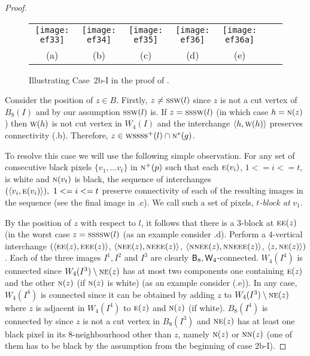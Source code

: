 \documentclass[lotsofwhite,charterfonts]{patmorin}
\newcommand{\eightfour}{\ensuremath{\protect\textup{\textsf{B}}_{8},\protect\textup{\textsf{W}}_{4}}}
\newcommand{\N}{\textsc{n}}
\newcommand{\NE}{\textsc{ne}}
\newcommand{\E}{\textsc{e}}
\renewcommand{\S}{\textsc{s}}
\newcommand{\W}{\textsc{w}}
\newcommand{\ic}[2]{\langle #1,#2 \rangle}
\newcommand{\sm}{\ensuremath{\setminus}}
\begin{document}
\begin{proof}
\begin{figure}[htbp]
\begin{center}
\begin{tabular}{ccccccc}
\texttt{[image: ef33]} & 
\texttt{[image: ef34]} & 
\texttt{[image: ef35]} &  
\texttt{[image: ef36]} &
\texttt{[image: ef36a]} 
\\
(a) & (b) & (c) & (d) & (e)
\end{tabular}
\end{center}
\caption{Illustrating Case~2b-I in the proof of .}
\end{figure}


Consider the position of $z\in B$. Firstly, $z\not=\S\S\W(l)$ since
$z$ is not a cut vertex of $B_8(I)$ and by our assumption $\S\S\W(l)$
is. If $z=\S\S\S\W(l)$  (in which case $h=\N(z)$) then $\W(h)$ is not
cut vertex in $W_4(I)$ and the interchange $\ic{h}{\W(h)}$ preserves
connectivity  (.b). Therefore, $z\in \W\S\S\S\S^+(l)
\cap \N^*(g)$.

To resolve this case we will use the following simple observation. For
any  set of consecutive black pixels $\{v_1, \dots v_t\}$ in $\N^+(p)$
such that each $\E(v_i)$, $1<=i<=t$, is white and $\N(v_t)$ is black,
the sequence of interchanges $(\ic{v_i}{\E(v_i)}),\ 1<=i<=t$ preserve
connectivity of each of the resulting images in the sequence (see the
final image in .c). We call such a set of pixels, {\em
$t$-block at} $v_1$. 

By the position of $z$ with respect to $l$, it follows that there is a
$3$-block at $\E\E(z)$ (in the worst case $z=\S\S\S\S\W(l)$ (as an
example consider .d). Perform a  $4$-vertical
interchange $(\ic{\E\E(z)}{\E\E\E(z)}$, $\ic{\NE\E(z)}{\NE\E\E(z)}$,
$\ic{\N\NE\E(z)}{\N\NE\E\E(z)}$, $\ic{z}{\NE(z)})$. Each of the three
images $I^1, I^2$ and $I^3$ are clearly $\eightfour$-connected.
$W_4(I^4)$ is connected since $W_4(I^3)\sm \NE(z)$ has at most two
components one containing $\E(z)$ and the other $\N(z)$ (if $\N(z)$ is
white) (as an example consider (.e)). In any case,
$W_4(I^4)$ is connected since it can be obtained by adding $z$ to
$W_4(I^3)\sm \NE(z)$ where $z$ is adjacent in $W_4(I^4)$ to $\E(z)$
and $\N(z)$ (if white). $B_8(I^4)$ is connected by 
since $z$ is not a cut vertex in $B_8(I^3)$ and $\NE(z)$ has at least
one black pixel in its $8$-neighbourhood other than $z$, namely
$\N(z)$ or $\N\N(z)$ (one of them has to be black by the assumption
from the beginning of case 2b-I).


\end{proof}
\end{document}
